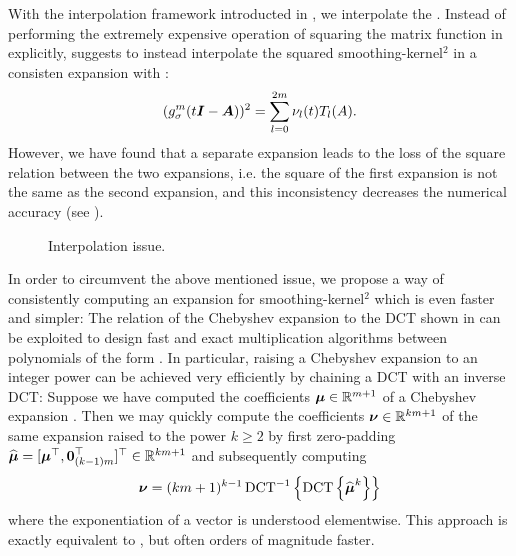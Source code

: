 With the interpolation framework introducted in ,
we interpolate the . Instead of performing the extremely
expensive operation of squaring the matrix function in 
explicitly, \cite{lin2017randomized} suggests to instead interpolate the
squared \gls{smoothing-kernel}$^2$ in a consisten expansion with
:
\begin{equation}
    (g_{\sigma}^m(t\boldsymbol{I} - \boldsymbol{A}))^2 = \sum_{l=0}^{2m} \nu_l(t) T_l(A).
    \label{equ:3-nystrom-ESS-chebyshev-expansion}
\end{equation}
However, we have found that a separate expansion leads to the loss of the
square relation between the two expansions, i.e. the square of the
first expansion is not the same as the second expansion, and this inconsistency
decreases the numerical accuracy (see ).\\
\begin{figure}[ht]
    \centering
    
    \caption{Interpolation issue.}
    \label{fig:3-nystrom-interpolation-issue}
\end{figure}

In order to circumvent the above mentioned issue, we propose a way of consistently computing
an expansion for \gls{smoothing-kernel}$^2$ which is even faster and simpler:
The relation of the Chebyshev expansion to the \gls{DCT} shown in 
can be exploited to design fast and exact multiplication algorithms between polynomials
of the form  \cite[Proposition~3.1]{baszenski1997cosine}.
In particular, raising a Chebyshev expansion to an integer power can be achieved
very efficiently by chaining a \gls{DCT} with an inverse \gls{DCT}:
Suppose we have computed the coefficients $\boldsymbol{\mu} \in \mathbb{R}^{m+1}$
of a Chebyshev expansion .
Then we may quickly compute the coefficients $\boldsymbol{\nu} \in \mathbb{R}^{km+1}$
of the same expansion raised to the power $k \geq 2$ by first zero-padding
$\widehat{\boldsymbol{\mu}} = [\boldsymbol{\mu}^{\top}, \boldsymbol{0}_{(k-1)m}^{\top}]^{\top} \in \mathbb{R}^{km+1}$
and subsequently computing
\begin{equation}
    \boldsymbol{\nu} = (km + 1)^{k - 1} \operatorname{DCT}^{-1}\left\{ \operatorname{DCT}\left\{\widehat{\boldsymbol{\mu}}^{k}\right\} \right\}
    \label{equ:3-nystrom-chebyshev-potentiate-coefficients}
\end{equation}
where the exponentiation of a vector is understood elementwise.
This approach is exactly equivalent to \cite[Algorithm~5]{lin2017randomized}, but
often orders of magnitude faster.\\

